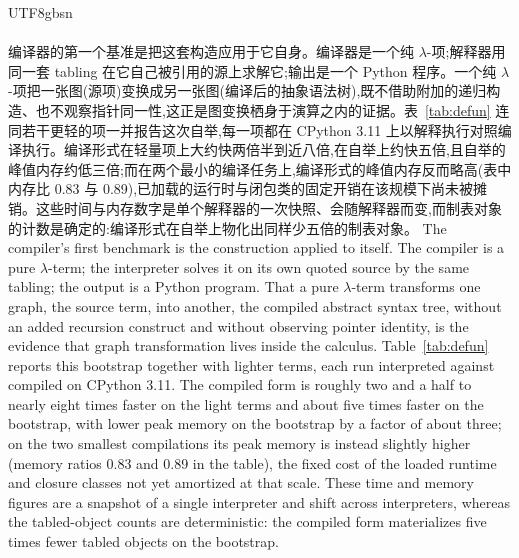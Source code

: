\begin{CJK*}{UTF8}{gbsn}
  \paragraph{}
  \ifPaperChinese
  编译器的第一个基准是把这套构造应用于它自身。编译器是一个纯 $\lambda$-项;解释器用同一套 tabling 在它自己被引用的源上求解它;输出是一个 Python 程序。一个纯 $\lambda$-项把一张图(源项)变换成另一张图(编译后的抽象语法树),既不借助附加的递归构造、也不观察指针同一性,这正是图变换栖身于演算之内的证据。表~\ref{tab:defun} 连同若干更轻的项一并报告这次自举,每一项都在 CPython 3.11 上以解释执行对照编译执行。编译形式在轻量项上大约快两倍半到近八倍,在自举上约快五倍,且自举的峰值内存约低三倍;而在两个最小的编译任务上,编译形式的峰值内存反而略高(表中内存比 0.83 与 0.89),已加载的运行时与闭包类的固定开销在该规模下尚未被摊销。这些时间与内存数字是单个解释器的一次快照、会随解释器而变,而制表对象的计数是确定的:编译形式在自举上物化出同样少五倍的制表对象。
  \else
  The compiler's first benchmark is the construction applied to itself. The compiler is a pure $\lambda$-term; the interpreter solves it on its own quoted source by the same tabling; the output is a Python program. That a pure $\lambda$-term transforms one graph, the source term, into another, the compiled abstract syntax tree, without an added recursion construct and without observing pointer identity, is the evidence that graph transformation lives inside the calculus. Table~\ref{tab:defun} reports this bootstrap together with lighter terms, each run interpreted against compiled on CPython 3.11. The compiled form is roughly two and a half to nearly eight times faster on the light terms and about five times faster on the bootstrap, with lower peak memory on the bootstrap by a factor of about three; on the two smallest compilations its peak memory is instead slightly higher (memory ratios 0.83 and 0.89 in the table), the fixed cost of the loaded runtime and closure classes not yet amortized at that scale. These time and memory figures are a snapshot of a single interpreter and shift across interpreters, whereas the tabled-object counts are deterministic: the compiled form materializes five times fewer tabled objects on the bootstrap.
  \fi


\end{CJK*}
